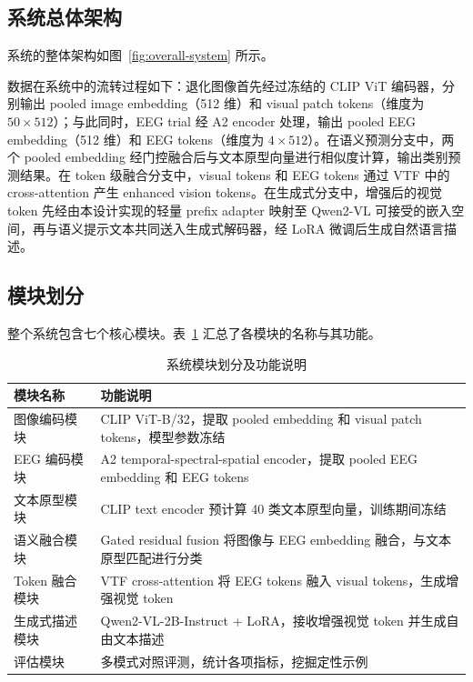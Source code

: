 \subsection{系统总体架构}

系统的整体架构如图~\ref{fig:overall-system} 所示。


数据在系统中的流转过程如下：退化图像首先经过冻结的 CLIP ViT 编码器，分别输出 pooled image embedding（512 维）和 visual patch tokens（维度为 $50\times512$）；与此同时，EEG trial 经 A2 encoder 处理，输出 pooled EEG embedding（512 维）和 EEG tokens（维度为 $4\times512$）。在语义预测分支中，两个 pooled embedding 经门控融合后与文本原型向量进行相似度计算，输出类别预测结果。在 token 级融合分支中，visual tokens 和 EEG tokens 通过 VTF 中的 cross-attention 产生 enhanced vision tokens。在生成式分支中，增强后的视觉 token 先经由本设计实现的轻量 prefix adapter 映射至 Qwen2-VL 可接受的嵌入空间，再与语义提示文本共同送入生成式解码器，经 LoRA 微调后生成自然语言描述。

\subsection{模块划分}

整个系统包含七个核心模块。表~\ref{tab:modules} 汇总了各模块的名称与其功能。

\begin{table}[htbp]
  \centering
  \caption{系统模块划分及功能说明}
  \label{tab:modules}
  \begin{tabularx}{\linewidth}{l X}
    \toprule
    模块名称 & 功能说明 \\
    \midrule
    图像编码模块 & CLIP ViT-B/32，提取 pooled embedding 和 visual patch tokens，模型参数冻结 \\
    EEG 编码模块 & A2 temporal-spectral-spatial encoder，提取 pooled EEG embedding 和 EEG tokens \\
    文本原型模块 & CLIP text encoder 预计算 40 类文本原型向量，训练期间冻结 \\
    语义融合模块 & Gated residual fusion 将图像与 EEG embedding 融合，与文本原型匹配进行分类 \\
    Token 融合模块 & VTF cross-attention 将 EEG tokens 融入 visual tokens，生成增强视觉 token \\
    生成式描述模块 & Qwen2-VL-2B-Instruct + LoRA，接收增强视觉 token 并生成自由文本描述 \\
    评估模块 & 多模式对照评测，统计各项指标，挖掘定性示例 \\
    \bottomrule
  \end{tabularx}
\end{table}

